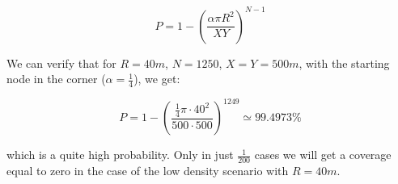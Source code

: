 \begin{equation}\label{eq:nocatastropheprobability}
	P = 1 - {\left(\frac{\alpha\pi R^2}{XY}\right)}^{N-1}
\end{equation}

We can verify that for \(R\!=\!40m\), \(N\!=\!1250\), \(X\!=\!Y\!=\!500m\), with
the starting node in the corner (\(\alpha\!=\!\frac{1}{4}\)), we get:

\[
	P = 1 -
	{\left(\frac{\frac{1}{4}\pi\cdot40^2}{500\cdot500}\right)}^{1249} \simeq
	99.4973\%
\]

which is a quite high probability. Only in just \(\frac{1}{200}\) cases we will
get a coverage equal to zero in the case of the low density scenario with
\(R\!=\!40m\).
